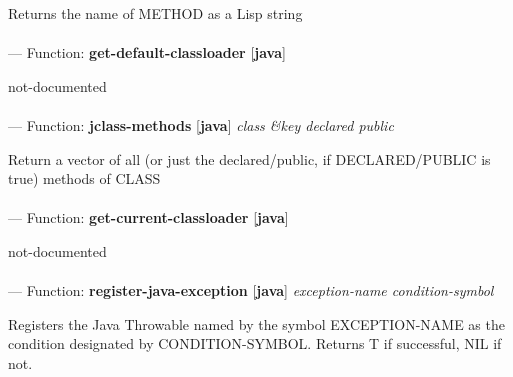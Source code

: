 \begin{adjustwidth}{5em}{5em}
Returns the name of METHOD as a Lisp string
\end{adjustwidth}

\paragraph{}
\label{JAVA:GET-DEFAULT-CLASSLOADER}
--- Function: \textbf{get-default-classloader} [\textbf{java}] \textit{}

\begin{adjustwidth}{5em}{5em}
not-documented
\end{adjustwidth}

\paragraph{}
\label{JAVA:JCLASS-METHODS}
--- Function: \textbf{jclass-methods} [\textbf{java}] \textit{class \&key declared public}

\begin{adjustwidth}{5em}{5em}
Return a vector of all (or just the declared/public, if DECLARED/PUBLIC is true) methods of CLASS
\end{adjustwidth}

\paragraph{}
\label{JAVA:GET-CURRENT-CLASSLOADER}
--- Function: \textbf{get-current-classloader} [\textbf{java}] \textit{}

\begin{adjustwidth}{5em}{5em}
not-documented
\end{adjustwidth}

\paragraph{}
\label{JAVA:REGISTER-JAVA-EXCEPTION}
--- Function: \textbf{register-java-exception} [\textbf{java}] \textit{exception-name condition-symbol}

\begin{adjustwidth}{5em}{5em}
Registers the Java Throwable named by the symbol EXCEPTION-NAME as the condition designated by CONDITION-SYMBOL.  Returns T if successful, NIL if not.
\end{adjustwidth}

